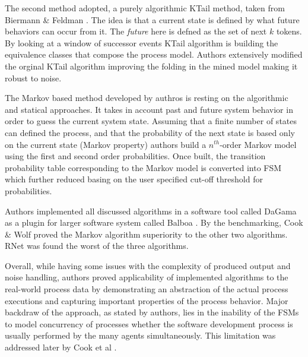 The second method adopted, a purely algorithmic KTail method, taken from Biermann \& Feldman \cite{citeulike:5120603}. The idea is that a current state is defined by what future behaviors can occur from it. The \textit{future} here is defned as the set of next $k$ tokens. By looking at a window of successor events KTail algorithm is building the equivalence classes that compose the process model. Authors extensively modified the orginal KTail algorithm improving the folding in the mined model making it robust to noise.

The Markov based method developed by authros is resting on the algorithmic and statical approaches. It takes in account past and future system behavior in order to guess the current system state. Assuming that a finite number of states can defined the process, and that the probability of the next state is based only on the current state (Markov property) authors build a $n^{th}$-order Markov model using the first and second order probabilities. Once built, the transition probability table corresponding to the Markov model is converted into FSM which further reduced basing on the user specified cut-off threshold for probabilities.

Authors implemented all discussed algorithms in a software tool called DaGama as a plugin for larger software system called Balboa \cite{citeulike:5120757}. By the benchmarking, Cook \& Wolf proved the Markov algorithm superiority to the other two algorithms. RNet was found the worst of the three algorithms. 

Overall, while having some issues with the complexity of produced output and noise handling, authors proved applicability of implemented algorithms to the real-world process data by demonstrating an abstraction of the actual process executions and capturing important properties of the process behavior. Major backdraw of the approach, as stated by authors, lies in the inability of the FSMs to model concurrency of processes whether the software development process is usually performed by the many agents simultaneously. This limitation was addressed later by Cook et al \cite{citeulike:5128143}.
